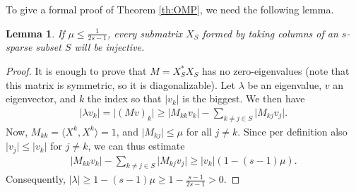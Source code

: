 \documentclass{article}
\newcommand{\sprod}[1]{\langle #1 \rangle}
\newtheorem{lemma}{Lemma}
\newcommand{\abs}[1]{\vert #1 \vert}
\begin{document}
To give a formal proof of Theorem \ref{th:OMP}, we need the following lemma.
\begin{lemma}
    If $\mu \leq \tfrac{1}{2s-1}$, every submatrix $X_S$ formed by taking columns of an $s$-sparse subset $S$ will be injective.
\end{lemma}
\begin{proof}
    It is enough to prove that $M=X_S^*X_S$ has no zero-eigenvalues (note that this matrix is symmetric, so it is diagonalizable). Let $\lambda$ be an eigenvalue, $v$ an eigenvector, and $k$ the index so that $\abs{v_k}$ is the biggest. We then have
    \begin{align*}
        \abs{\lambda v_k} = \abs{(Mv)_k} \geq \abs{M_{kk} v_k} - \sum_{k \neq j \in S}\abs{M_{kj}v_j}.
    \end{align*}
    Now, $M_{kk}=\sprod{X^k,X^k}=1$, and $\abs{M_{kj}}\leq \mu$ for all $j \neq k$. Since per definition also $\abs{v_j} \leq \abs{v_k}$ for $j\neq k$, we can thus estimate
    \begin{align*}
        \abs{M_{kk} v_k} - \sum_{k \neq j \in S}\abs{M_{kj}v_j} \geq \abs{v_k}(1-(s-1)\mu).
    \end{align*}
    Consequently, $\abs{\lambda} \geq 1 - (s-1)\mu \geq 1- \tfrac{s-1}{2s-1}>0$.
\end{proof}
\end{document}
